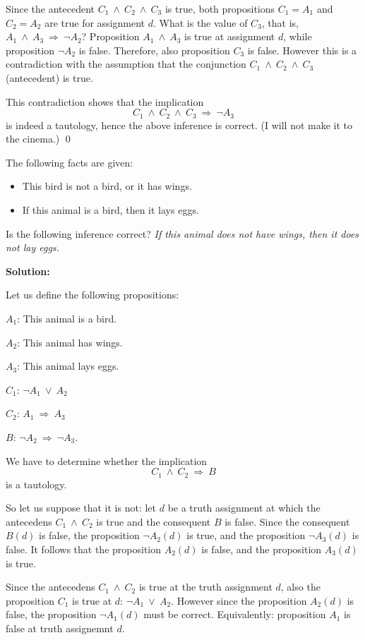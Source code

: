 \documentclass[11pt,paper=b5,footinclude,headinclude]{scrbook} %
\def\ali {{~\vee~}}
\def\inn {{~\wedge~}}
\def\sledi {{~\Rightarrow~}}
\theoremstyle{remark}
\theoremstyle{definition} %
\theoremstyle{theorem} %
\begin{document}
Since the antecedent $C_1\inn C_2\inn C_3$ is true, both propositions $C_1=A_1$ and $C_2=A_2$ are true for assignment $d$.
What is the value of $C_3$, that is,~$A_1\inn A_3\sledi \neg A_2$?
Proposition $A_1\inn A_3$ is true at assignment $d$, while proposition $\neg A_2$ is false. Therefore, also proposition $C_3$ is false.
However this is a contradiction with the assumption that the conjunction
$C_1\inn C_2\inn C_3$ (antecedent) is true.

This contradiction shows that the implication
$$C_1\inn C_2\inn C_3\sledi \neg A_3$$
is indeed a tautology, hence the above inference is correct. (I will not make it to the cinema.)
\qed

\bigskip

The following facts are given:
\begin{itemize}
  \item This bird is not a bird, or it has wings.
  \item If this animal is a bird, then it lays eggs.
\end{itemize}
Is the following inference correct?
{\em If this animal does not have wings, then it does not lay eggs.}

\medskip
\textbf{ Solution:}

Let us define the following propositions:

$A_1$: This animal is a bird.

$A_2$: This animal has wings.

$A_3$: This animal lays eggs.

$C_1$: $\neg A_1\ali A_2$

$C_2$: $A_1\sledi A_3$

$B$: $\neg A_2\sledi \neg A_3$.

We have to determine whether the implication
$$C_1\inn C_2\sledi B$$
is a tautology.

So let us suppose that it is not: let $d$ be a truth assignment at which the antecedens
$C_1\inn C_2$ is true and the consequent $B$ is false.
Since the consequent $B(d)$ is false, the proposition $\neg A_2(d)$ is true, and the proposition
$\neg A_3 (d)$ is false. It follows that the proposition $A_2(d)$ is false, and the proposition
$A_3(d)$ is true.

Since the antecedens $C_1\inn C_2$ is true at the truth assignment $d$, also the proposition $C_1$ is true at $d$: $\neg A_1\ali A_2$.
However since the proposition $A_2(d)$ is false, the proposition
$\neg A_1(d)$ must be correct. Equivalently: proposition $A_1$ is false at truth assignemnt $d$.
\end{document}
